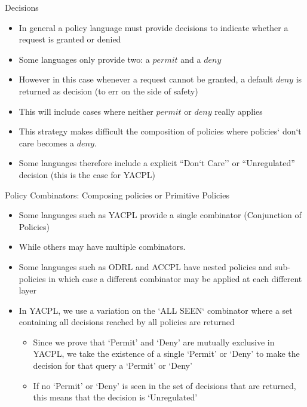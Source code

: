 \documentclass{beamer}
\begin{document}
\begin{frame}[fragile]{Decisions}
\begin{itemize}
\item In general a policy language must provide decisions to indicate whether a request is granted or denied
\item Some languages only provide two: a $permit$ and a $deny$ 
\item However in this case whenever a request cannot be granted, a default $deny$ is returned as decision (to err on the side of safety)
\item This will include cases where neither $permit$ or $deny$ really applies
\item This strategy makes difficult the composition of policies where policies` don`t care becomes a $deny$. 
\item Some languages therefore include a explicit ``Don`t Care'' or ``Unregulated'' decision (this is the case for YACPL) 
\end{itemize}
\end{frame}
\begin{frame}[fragile]{Policy Combinators: Composing policies or Primitive Policies}
\begin{itemize}
\item Some languages such as YACPL provide a single combinator (Conjunction of Policies)
\item While others may have multiple combinators.
\item Some languages such as ODRL and ACCPL have nested policies and sub-policies in which case a different combinator may be applied at each different layer
\item In YACPL, we use a variation on the `ALL SEEN` combinator where a set containing all decisions reached by all policies are returned
     \begin{itemize}
         \item Since we prove that `Permit' and `Deny' are mutually exclusive in YACPL, we take the existence of a single `Permit' or `Deny' to make the decision for that query a `Permit' or `Deny'
         \item If no `Permit' or `Deny' is seen in the set of decisions that are returned, this means that the decision is `Unregulated'
     \end{itemize}
\end{itemize}
\end{frame}
\end{document}
